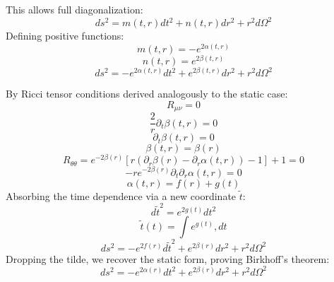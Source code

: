 \documentclass[11pt, a4paper]{report}
\begin{document}
This allows full diagonalization:
\begin{equation}
ds^{2}=m(t,r)dt^{2}+n(t,r)dr^{2}+r^{2}d\Omega^{2}
\end{equation}
Defining positive functions:
\begin{equation}
m(t,r) = -e^{2\alpha(t,r)}
\end{equation}
\begin{equation}
n(t,r) = e^{2\beta(t,r)}
\end{equation}
\begin{equation}
ds^{2}=-e^{2\alpha(t,r)}dt^{2}+e^{2\beta(t,r)}dr^{2}+r^{2}d\Omega^{2}
\end{equation}

By Ricci tensor conditions derived analogously to the static case:
\begin{equation}
R_{\mu\nu} = 0 \label{eq:vacuum_einstein}
\end{equation}
\begin{equation}
\frac{2}{r} \partial_t \beta(t,r) = 0 \label{eq:Rtr_zero}
\end{equation}
\begin{equation}
\partial_t \beta(t,r) = 0 \label{eq:dt_beta_zero}
\end{equation}
\begin{equation}
\beta(t,r) = \beta(r) \label{eq:beta_r_only}
\end{equation}
\begin{equation}
R_{\theta\theta} = e^{-2\beta(r)} \left[ r(\partial_r \beta(r) - \partial_r \alpha(t,r)) - 1 \right] + 1 = 0 \label{eq:R_thetatheta_zero}
\end{equation}
\begin{equation}
-r e^{-2\beta(r)} \partial_t \partial_r \alpha(t,r) = 0 \label{eq:dt_dr_alpha}
\end{equation}
\begin{equation}
\alpha(t,r) = f(r) + g(t) \label{eq:alpha_separable}
\end{equation}
Absorbing the time dependence via a new coordinate $\tilde{t}$:
\begin{equation}
d\tilde{t}^2 = e^{2g(t)} dt^2 \label{eq:dttilde_squared}
\end{equation}
\begin{equation}
\tilde{t}(t) = \int e^{g(t)} , dt \label{eq:t_tilde_def}
\end{equation}
\begin{equation}
ds^2 = -e^{2f(r)} d\tilde{t}^2 + e^{2\beta(r)} dr^2 + r^2 d\Omega^2 \label{eq:metric_ttilde}
\end{equation}
Dropping the tilde, we recover the static form, proving Birkhoff's theorem:
\begin{equation}
ds^2 = -e^{2\alpha(r)} dt^2 + e^{2\beta(r)} dr^2 + r^2 d\Omega^2 \label{eq:static_metric}
\end{equation}
\end{document}
